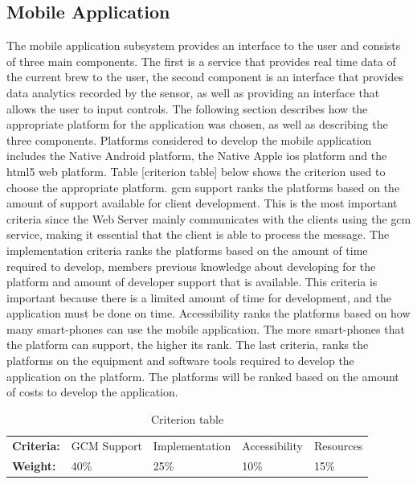 \documentclass{article}
\begin{document}
\subsection{Mobile Application}\label{subsec:mobile-app}
The mobile application subsystem provides an interface to the user and consists of three main components. The first is a service that provides real time data of the current brew to the user, the second component is an interface that provides data analytics recorded by the sensor, as well as providing an interface that allows the user to input controls. The following section describes how the appropriate platform for the application was chosen, as well as describing the three components.
Platforms considered to develop the mobile application includes the Native Android platform, the Native Apple \gls{ios} platform and the \gls{html5} web platform. Table [criterion table] below shows the criterion used to choose the appropriate platform. \gls{gcm} support ranks the platforms based on the amount of support available for client development. This is the most important criteria since the Web Server mainly communicates with the clients using the \gls{gcm} service, making it essential that the client is able to process the message. The implementation criteria ranks the platforms based on the amount of time required to develop, members previous knowledge about developing for the platform and amount of developer support that is available. This criteria is important because there is a limited amount of time for development, and the application must be done on time. Accessibility ranks the platforms based on how many smart-phones can use the mobile application. The more smart-phones that the platform can support, the higher its rank. The last criteria, ranks the platforms on the equipment and software tools required to develop the application on the platform. The platforms will be ranked based on the amount of costs to develop the application.

\begin{table}[H]
\caption{Criterion table}
\centering
\begin{tabularx}{\textwidth}{l l l l Z}
\toprule
\textbf{Criteria:} & GCM Support & Implementation & Accessibility & Resources \\
\textbf{Weight:}   & 40\%        & 25\%           & 10\%          & 15\% \\
\bottomrule
\end{tabularx}
\label{tab:criteria}
\end{table}
\end{document}

